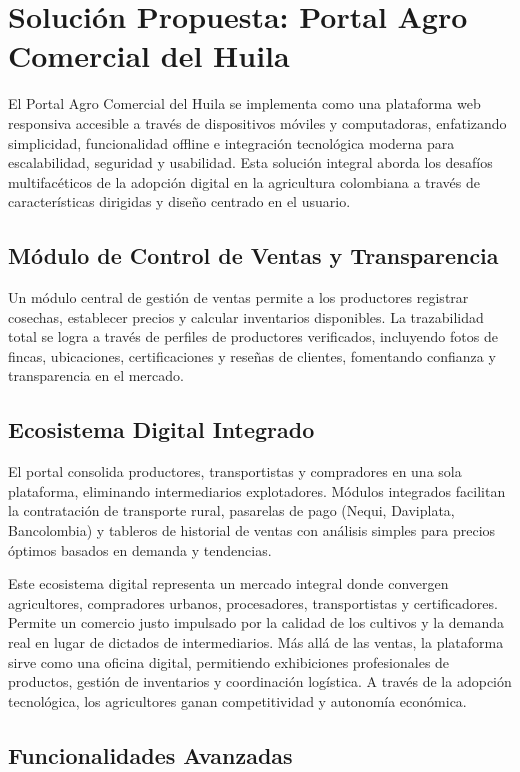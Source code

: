\section{Solución Propuesta: Portal Agro Comercial del Huila}

El Portal Agro Comercial del Huila se implementa como una plataforma web responsiva accesible a través de dispositivos móviles y computadoras, enfatizando simplicidad, funcionalidad offline e integración tecnológica moderna para escalabilidad, seguridad y usabilidad. Esta solución integral aborda los desafíos multifacéticos de la adopción digital en la agricultura colombiana a través de características dirigidas y diseño centrado en el usuario.

\subsection{Módulo de Control de Ventas y Transparencia}

Un módulo central de gestión de ventas permite a los productores registrar cosechas, establecer precios y calcular inventarios disponibles. La trazabilidad total se logra a través de perfiles de productores verificados, incluyendo fotos de fincas, ubicaciones, certificaciones y reseñas de clientes, fomentando confianza y transparencia en el mercado.
\subsection{Ecosistema Digital Integrado}

El portal consolida productores, transportistas y compradores en una sola plataforma, eliminando intermediarios explotadores. Módulos integrados facilitan la contratación de transporte rural, pasarelas de pago (Nequi, Daviplata, Bancolombia) y tableros de historial de ventas con análisis simples para precios óptimos basados en demanda y tendencias.

Este ecosistema digital representa un mercado integral donde convergen agricultores, compradores urbanos, procesadores, transportistas y certificadores. Permite un comercio justo impulsado por la calidad de los cultivos y la demanda real en lugar de dictados de intermediarios. Más allá de las ventas, la plataforma sirve como una oficina digital, permitiendo exhibiciones profesionales de productos, gestión de inventarios y coordinación logística. A través de la adopción tecnológica, los agricultores ganan competitividad y autonomía económica.
\subsection{Funcionalidades Avanzadas}

